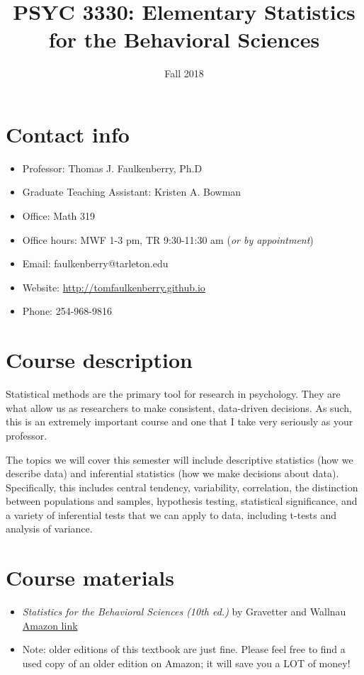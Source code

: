 \documentclass[10pt]{article}
\date{Fall 2018}
\title{PSYC 3330: Elementary Statistics for the Behavioral Sciences}
\begin{document}
\maketitle

\section*{Contact info}
\label{sec:orgd620cb2}
\begin{itemize}
\item Professor: Thomas J. Faulkenberry, Ph.D
\item Graduate Teaching Assistant: Kristen A. Bowman
\item Office: Math 319
\item Office hours: MWF 1-3 pm, TR 9:30-11:30 am (\emph{or by appointment})
\item Email: faulkenberry@tarleton.edu
\item Website: \url{http://tomfaulkenberry.github.io}
\item Phone: 254-968-9816
\end{itemize}

\section*{Course description}
\label{sec:org4c25426}

Statistical methods are the primary tool for research in psychology.  
They are what allow us as researchers to make consistent, data-driven 
decisions.  As such, this is an extremely important course and one that I 
take very seriously as your professor.

The topics we will cover this semester will include descriptive statistics 
(how we describe data) and inferential statistics (how we make decisions 
about data).  Specifically, this includes central tendency, variability, 
correlation, the distinction between populations and samples, hypothesis 
testing, statistical significance, and a variety of inferential tests 
that we can apply to data, including t-tests and analysis of variance.

\section*{Course materials}
\label{sec:org35e1951}
\begin{itemize}
\item \emph{Statistics for the Behavioral Sciences (10th ed.)} by Gravetter and Wallnau \href{http://www.amazon.com/Statistics-Behavioral-Sciences-MindTap-Psychology/dp/1305504917/}{Amazon link}
\item Note:  older editions of this textbook are just fine.  Please feel free to find a used copy of an older edition on Amazon; it will save you a LOT of money!
\end{itemize}
\end{document}
